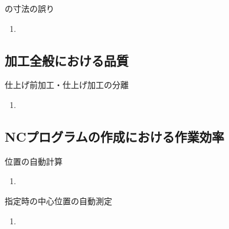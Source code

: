 \begin{Issues}{\EndFaceBoringMilling の寸法の誤り\TBW}
\begin{enumerate}[label=\sarrow]
\item[{\sarrow[red]}]
\end{enumerate}
\end{Issues}


\subsection{加工全般における品質}

\begin{Issues}{仕上げ前加工・仕上げ加工の分離\TBW}
\begin{enumerate}[label=\sarrow]
\item[{\sarrow[red]}]
\end{enumerate}
\end{Issues}


\clearpage


\subsection{NCプログラムの作成における作業効率}

\begin{Issues}{\KeywayCenter 位置の自動計算\TBW}
\begin{enumerate}[label=\sarrow]
\item[{\sarrow[red]}]
\end{enumerate}
\end{Issues}

\begin{Issues}{\AsideKeywayDepth 指定時の中心位置の自動測定\TBW}
\begin{enumerate}[label=\sarrow]
\item[{\sarrow[red]}]
\end{enumerate}
\end{Issues}

